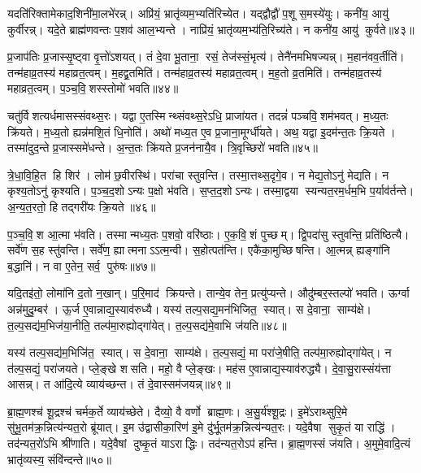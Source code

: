 यदति॑रिक्तामेकाद॒शिनी॑मा॒लभे॑रन्न्। अप्रि॑यं॒ भ्रातृ॑व्यम॒भ्यति॑रिच्येत। यद्द्वौद्वौ॑ प॒शू स॒मस्ये॑युः। कनी॑य॒ आयु॑ कुर्वीरन्न्। यदे॒ते ब्राह्म॑णवन्तः प॒शव॑ आल॒भ्यन्ते। नाप्रि॑यं॒ भ्रातृ॑व्यम॒भ्य॑ति॒रिच्य॑ते। न कनी॑य॒ आयु॑ कुर्वते॥४३॥\anuvakamend[ते ए॒वाल॑भन्ते मैत्रावरु॒णीमाल॑भ॒न्तेऽव॑रुद्ध्यै स॒प्त च॑]

प्र॒जाप॑तिः प्र॒जास्सृ॒ष्ट्वा वृ॒त्तो॑ऽशयत्। तं दे॒वा भू॒ताना॒ रसं॒ तेज॑स्सं॒भृत्य॑। तेनै॑नमभिषज्यन्न्। म॒हान॑वव॒र्तीति॑। तन्म॑हाव्र॒तस्य॑ महाव्रत॒त्वम्। म॒हद्व्र॒तमिति॑। तन्म॑हाव्र॒तस्य॑ महाव्रत॒त्वम्। म॒ह॒तो व्र॒तमिति॑। तन्म॑हाव्र॒तस्य॑ महाव्रत॒त्वम्। प॒ञ्च॒वि॒शस्स्तोमो॑ भवति॥४४॥

चतु॑र्विशत्यर्धमासस्संवथ्स॒रः। यद्वा ए॒तस्मिन्थ्संवथ्स॒रेऽधि॒ प्राजा॑यत। तदन्नं॑ पञ्चवि॒शम॑भवत्। म॒ध्य॒तः क्रि॑यते। म॒ध्य॒तो ह्यन्न॑मशि॒तं धि॒नोति॑। अथो॑ मध्य॒त ए॒व प्र॒जाना॒मूर्ग्धी॑यते। अथ॒ यद्वा इ॒दम॑न्त॒तः क्रि॒यते। तस्मा॑दुद॒न्ते प्र॒जास्समे॑धन्ते। अ॒न्त॒तः क्रि॑यते प्र॒जन॑नायै॒व। त्रि॒वृच्छिरो॑ भवति॥४५॥

त्रे॒धा॒वि॒हि॒त हि शिर॑। लोम॑ छ॒वीरस्थि॑। परा॑चा स्तुवन्ति। तस्मा॒त्तथ्स॒दृगे॒व। न मेद्य॒तोऽनु॑ मेद्यति। न कृश्य॒तोऽनु॑ कृश्यति। प॒ञ्च॒द॒शोऽन्यः प॒क्षो भ॑वति। स॒प्त॒द॒शोऽन्यः। तस्मा॒द्वया स्यन्यत॒रम॒र्धम॒भि प॒र्याव॑र्तन्ते। अ॒न्य॒त॒रतो॒ हि तद्गरी॑यः क्रि॒यते॥४६॥

प॒ञ्च॒वि॒श आ॒त्मा भ॑वति। तस्मान्मध्य॒तः प॒शवो॒ वरि॑ष्ठाः। ए॒क॒वि॒शं पुच्छम्। द्वि॒पदा॑सु स्तुवन्ति॒ प्रति॑ष्ठित्यै। सर्वे॑ण स॒ह स्तु॑वन्ति। सर्वे॑ण॒ ह्यात्मनाऽऽत्म॒न्वी। स॒होत्पत॑न्ति। एकै॑का॒मुच्छिषन्ति। आ॒त्मन्न् ह्यङ्गा॑नि ब॒द्धानि॑। न वा ए॒तेन॒ सर्व॒ पुरु॑षः॥४७॥

यदि॒तइ॑तो॒ लोमा॑नि द॒तो न॒खान्। प॒रि॒माद॑ क्रियन्ते। तान्ये॒व तेन॒ प्रत्यु॑प्यन्ते। औदु॑म्बर॒स्तल्पो॑ भवति। ऊर्ग्वा अन्न॑मुदु॒म्बर॑। ऊ॒र्ज ए॒वान्नाद्य॒स्याव॑रुध्यै। यस्य॑ तल्प॒सद्य॒मन॑भिजित॒ स्यात्। स दे॒वाना॒ साम्य॑क्षे। त॒ल्प॒सद्य॑म॒भिज॑या॒नीति॒ तल्प॑मा॒रुह्योद्गा॑येत्। त॒ल्प॒सद्य॑मे॒वाभि ज॑यति॥४८॥

यस्य॑ तल्प॒सद्य॑म॒भिजि॑त॒ स्यात्। स दे॒वाना॒ साम्य॑क्षे। त॒ल्प॒सद्यं॒ मा परा॑जे॒षीति॒ तल्प॑मा॒रुह्योद्गा॑येत्। न त॑ल्प॒सद्यं॒ परा॑जयते। प्ले॒ङ्खे शसति। महो॒ वै प्ले॒ङ्खः। मह॑स ए॒वान्नाद्य॒स्याव॑रुद्ध्यै। दे॒वा॒सु॒रास्संय॑त्ता आसन्न्। त आ॑दि॒त्ये व्याय॑च्छन्त। तं दे॒वास्सम॑जयन्न्॥४९॥

ब्रा॒ह्म॒णश्च॑ शू॒द्रश्च॑ चर्मक॒र्ते व्याय॑च्छेते। दैव्यो॒ वै वर्णो ब्राह्म॒णः। अ॒सु॒र्य॑श्शू॒द्रः। इ॒मे॑ऽराथ्सुरि॒मे सु॑भू॒तम॑क्र॒न्नित्य॑न्यत॒रो ब्रू॑यात्। इ॒म उ॑द्वासीका॒रिण॑ इ॒मे दु॑र्भू॒तम॑क्र॒न्नित्य॑न्यत॒रः। यदे॒वैषा सुकृ॒तं या राद्धि॑। तद॑न्यत॒रो॑ऽभि श्री॑णाति। यदे॒वैषां दुष्कृ॒तं याऽराद्धिः। तद॑न्यत॒रोऽप॑ हन्ति। ब्रा॒ह्म॒णस्सं ज॑यति। अ॒मुमे॒वादि॒त्यं भ्रातृ॑व्यस्य॒ संवि॑न्दन्ते॥५०॥

